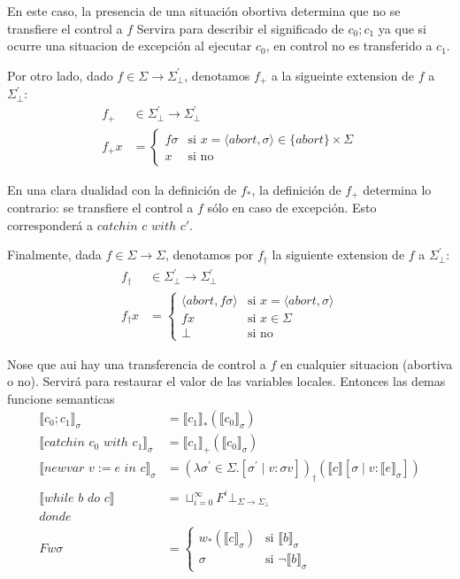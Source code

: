 \documentclass[12pt,a4paper]{article}
\begin{document}
En este caso, la presencia de una situación obortiva determina que no se 
transfiere el control a $f$ Servira para describir el significado de $c_{0};c_{1}$
ya que si ocurre una situacion de excepción al ejecutar $c_{0}$, en control no es 
transferido a $c_{1}$.

Por otro lado, dado $f\in \Sigma \to \Sigma^{'}_{\bot}$, denotamos $f_{+}$ a la sigueinte extension de $f$ a $\Sigma^{'}_{\bot}$:
\begin{align*}
f_{+} & \in \Sigma^{'}_{\bot} \to \Sigma^{'}_{\bot}\\
f_{+}x &= \begin{cases}
  f \sigma & \text{si}\,\, x = \langle abort, \sigma \rangle \in \{ abort\}\times \Sigma\\
  x & \text{si no}
\end{cases}
\end{align*}

En una clara dualidad con la definición de $f_{*}$, la definición de $f_{+}$ 
determina lo contrario: se transfiere el control a $f$ sólo en caso de excepción. 
Esto corresponderá a $catchin\,\, c\,\, with\,\, c'$.

Finalmente, dada $f\in \Sigma \to \Sigma$, denotamos por $f_{\dagger}$ la siguiente
extension de $f$ a $\Sigma^{'}_{\bot}$:
\begin{align*}
f_{\dagger} & \in \Sigma^{'}_{\bot} \to \Sigma^{'}_{\bot}\\
f_{\dagger}x &= \begin{cases}
  \langle abort, f\sigma \rangle & \text{si}\,\, x = \langle abort, \sigma \rangle \\
  f x & \text{si}\,\, x \in \Sigma\\
  \bot & \text{si no}
\end{cases}
\end{align*}


Nose que aui hay una transferencia de control a $f$ en cualquier situacion (abortiva o no). Servirá para restaurar el valor de las variables locales. Entonces las 
demas funcione semanticas
\begin{align*}
\llbracket c_{0};c_{1} \rrbracket_{\sigma} &= \llbracket c_{1}\rrbracket_{*}(\llbracket c_{0}\rrbracket_{\sigma})\\
\llbracket catchin \,\,c_{0}\,\, with \,\,c_{1} \rrbracket_{\sigma} &= \llbracket c_{1}\rrbracket_{+}(\llbracket c_{0}\rrbracket_{\sigma})\\
\llbracket newvar\,\, v := e\,\, in\,\, c \rrbracket_{\sigma} &= (\lambda\sigma^{'} \in \Sigma. 
[\sigma^{'} \mid v : \sigma v])_{\dagger} (\llbracket c\rrbracket[\sigma \mid v : \llbracket e\rrbracket_{\sigma} ])\\
\llbracket while\,\,b\,\,do\,\,c\rrbracket &= \sqcup_{i=0}^{\infty} F^{i} \bot_{\Sigma \to \Sigma_{\bot}} \\
donde \\
F w \sigma &= \begin{cases}
  w_{*}(\llbracket c\rrbracket_{\sigma}) & \text{si}\,\, \llbracket b\rrbracket_{\sigma}\\
  \sigma & \text{si}\,\, \neg \llbracket b\rrbracket_{\sigma}
  \end{cases}
\end{align*}
\end{document}
